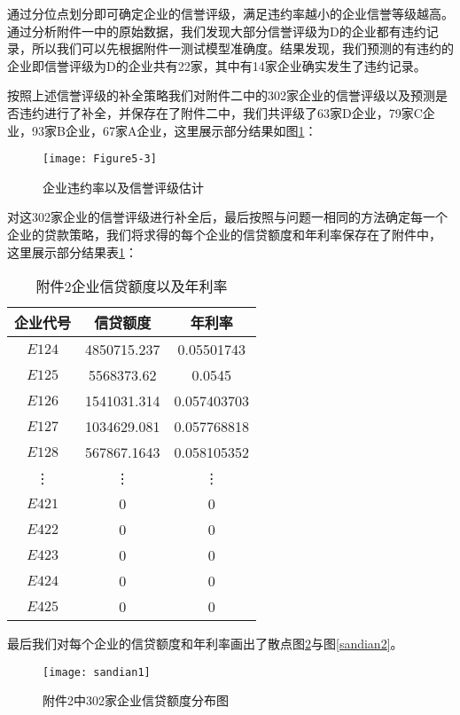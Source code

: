 \documentclass{cumcmthesis}
\begin{document}
通过分位点划分即可确定企业的信誉评级，满足违约率越小的企业信誉等级越高。通过分析附件一中的原始数据，我们发现大部分信誉评级为D的企业都有违约记录，所以我们可以先根据附件一测试模型准确度。结果发现，我们预测的有违约的企业即信誉评级为D的企业共有22家，其中有14家企业确实发生了违约记录。

按照上述信誉评级的补全策略我们对附件二中的302家企业的信誉评级以及预测是否违约进行了补全，并保存在了附件二中，我们共评级了63家D企业，79家C企业，93家B企业，67家A企业，这里展示部分结果如图\ref{figpingji}：


\begin{figure}[H]
    \centering
    \texttt{[image: Figure5-3]}
    \caption{企业违约率以及信誉评级估计}
    \label{figpingji}
\end{figure}

对这302家企业的信誉评级进行补全后，最后按照与问题一相同的方法确定每一个企业的贷款策略，我们将求得的每个企业的信贷额度和年利率保存在了附件中，
这里展示部分结果表\ref{table23445}：

\begin{table}[H]
    \begin{center}
    \begin{tabular}{|c|c|c|}
        \hline
    企业代号 & 信贷额度 & 年利率\\
    \hline
    $E124$ & 4850715.237 & 0.05501743\\
    $E125$ & 5568373.62 & 0.0545\\
    $E126$ & 1541031.314 & 0.057403703\\
    $E127$ & 1034629.081 & 0.057768818\\
    $E128$ & 567867.1643 & 0.058105352\\
    \vdots & \vdots & \vdots\\
    $E421$ & 0 & 0\\
    $E422$ & 0 & 0\\
    $E423$ & 0 & 0\\
    $E424$ & 0 & 0\\
    $E425$ & 0 & 0\\
    \hline
    \end{tabular}
    \end{center}
    \caption{附件2企业信贷额度以及年利率}
    \label{table23445}
    \end{table}

    最后我们对每个企业的信贷额度和年利率画出了散点图\ref{sandian1}与图\ref{sandian2}。
    \begin{figure}[H]
        \centering
        \texttt{[image: sandian1]}
        \caption{附件2中302家企业信贷额度分布图}
        \label{sandian1}
    \end{figure}
\end{document}
